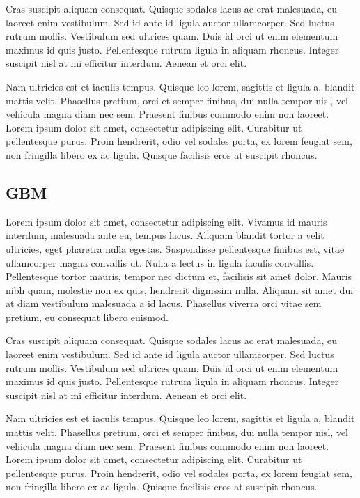 \documentclass[a4paper, nobind]{templates/ociamthesis}
\theoremstyle{definition}
\theoremstyle{definition}
\theoremstyle{definition}
\theoremstyle{remark}
\begin{document}
Cras suscipit aliquam consequat. Quisque sodales lacus ac erat malesuada, eu laoreet enim vestibulum. Sed id ante id ligula auctor ullamcorper. Sed luctus rutrum mollis. Vestibulum sed ultrices quam. Duis id orci ut enim elementum maximus id quis justo. Pellentesque rutrum ligula in aliquam rhoncus. Integer suscipit nisl at mi efficitur interdum. Aenean et orci elit.

Nam ultricies est et iaculis tempus. Quisque leo lorem, sagittis et ligula a, blandit mattis velit. Phasellus pretium, orci et semper finibus, dui nulla tempor nisl, vel vehicula magna diam nec sem. Praesent finibus commodo enim non laoreet. Lorem ipsum dolor sit amet, consectetur adipiscing elit. Curabitur ut pellentesque purus. Proin hendrerit, odio vel sodales porta, ex lorem feugiat sem, non fringilla libero ex ac ligula. Quisque facilisis eros at suscipit rhoncus.

\hypertarget{gbm}{%
\subsection{GBM}\label{gbm}}

Lorem ipsum dolor sit amet, consectetur adipiscing elit. Vivamus id mauris interdum, malesuada ante eu, tempus lacus. Aliquam blandit tortor a velit ultricies, eget pharetra nulla egestas. Suspendisse pellentesque finibus est, vitae ullamcorper magna convallis ut. Nulla a lectus in ligula iaculis convallis. Pellentesque tortor mauris, tempor nec dictum et, facilisis sit amet dolor. Mauris nibh quam, molestie non ex quis, hendrerit dignissim nulla. Aliquam sit amet dui at diam vestibulum malesuada a id lacus. Phasellus viverra orci vitae sem pretium, eu consequat libero euismod.

Cras suscipit aliquam consequat. Quisque sodales lacus ac erat malesuada, eu laoreet enim vestibulum. Sed id ante id ligula auctor ullamcorper. Sed luctus rutrum mollis. Vestibulum sed ultrices quam. Duis id orci ut enim elementum maximus id quis justo. Pellentesque rutrum ligula in aliquam rhoncus. Integer suscipit nisl at mi efficitur interdum. Aenean et orci elit.

Nam ultricies est et iaculis tempus. Quisque leo lorem, sagittis et ligula a, blandit mattis velit. Phasellus pretium, orci et semper finibus, dui nulla tempor nisl, vel vehicula magna diam nec sem. Praesent finibus commodo enim non laoreet. Lorem ipsum dolor sit amet, consectetur adipiscing elit. Curabitur ut pellentesque purus. Proin hendrerit, odio vel sodales porta, ex lorem feugiat sem, non fringilla libero ex ac ligula. Quisque facilisis eros at suscipit rhoncus.
\end{document}
